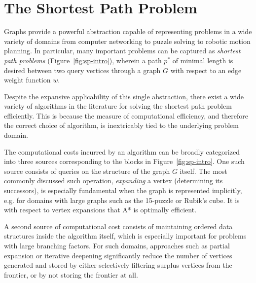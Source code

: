 \section{The Shortest Path Problem}

Graphs provide a powerful abstraction
capable of representing problems in a wide variety of domains
from computer networking to puzzle solving
to robotic motion planning.
In particular,
many important problems can be captured
as \emph{shortest path problems} (Figure~\ref{fig:sp-intro}),
wherein a path $p^*$ of minimal length is desired
between two query vertices through a graph $G$
with respect to an edge weight function $w$.

Despite the expansive applicability of this single abstraction,
there exist a wide variety of algorithms in the literature
for solving the shortest path problem efficiently.
This is because the measure of computational efficiency,
and therefore the correct choice of algorithm,
is inextricably tied to the underlying problem domain.

The computational costs incurred by an algorithm
can be broadly categorized into three sources
corresponding to the blocks in Figure~\ref{fig:sp-intro}.
One such source consists of queries on the structure
of the graph $G$ itself.
The most commonly discussed such operation,
\emph{expanding} a vertex (determining its successors),
is especially fundamental
when the graph is represented implicitly,
e.g. for domains with large graphs
such as the 15-puzzle or Rubik's cube.
It is with respect to vertex expansions
that A* \citep{hart1968astar} is optimally efficient.

A second source of computational cost consists of maintaining
ordered data structures inside the algorithm itself,
which is especially important for problems with large branching
factors.
For such domains,
approaches such as partial expansion \citep{yoshizumi2000peastar}
or iterative deepening \citep{korf1985idastar}
significantly reduce the number of vertices generated and stored
by either selectively filtering surplus vertices from the frontier,
or by not storing the frontier at all.

